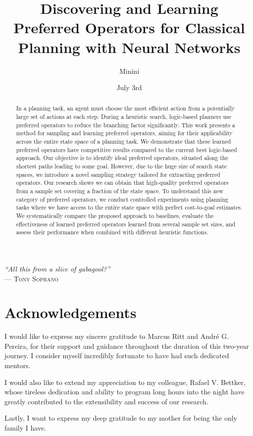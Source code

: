 \documentclass[ppgc,diss,english]{iiufrgs}
\title{Discovering and Learning Preferred Operators for Classical Planning with Neural Networks}
\author{Minini}{Pedro Probst}
\date{July 3rd}{2023}
\begin{document}
\maketitle

\clearpage
\begin{flushright}
\mbox{}\vfill
{\sffamily\itshape
    ``All this from a slice of gabagool?''\\}
--- \textsc{Tony Soprano}
\end{flushright}

\chapter*{Acknowledgements}

I would like to express my sincere gratitude to Marcus Ritt and André G. Pereira, for their support and guidance throughout the duration of this two-year journey. I consider myself incredibly fortunate to have had such dedicated mentors.

I would also like to extend my appreciation to my colleague, Rafael V. Bettker, whose tireless dedication and ability to program long hours into the night have greatly contributed to the extensibility and success of our research.

Lastly, I want to express my deep gratitude to my mother for being the only family I have.

\begin{abstract}
In a planning task, an agent must choose the most efficient action from a potentially large set of actions at each step. During a heuristic search, logic-based planners use preferred operators to reduce the branching factor significantly. This work presents a method for sampling and learning preferred operators, aiming for their applicability across the entire state space of a planning task. We demonstrate that these learned preferred operators have competitive results compared to the current best logic-based approach.
Our objective is to identify ideal preferred operators, situated along the shortest paths leading to some goal. However, due to the huge size of search state spaces, we introduce a novel sampling strategy tailored for extracting preferred operators. Our research shows we can obtain that high-quality preferred operators from a sample set covering a fraction of the state space.
To understand this new category of preferred operators, we conduct controlled experiments using planning tasks where we have access to the entire state space with perfect cost-to-goal estimates. We systematically compare the proposed approach to baselines, evaluate the effectiveness of learned preferred operators learned from several sample set sizes, and assess their performance when combined with different heuristic functions.
\end{abstract}
\end{document}
